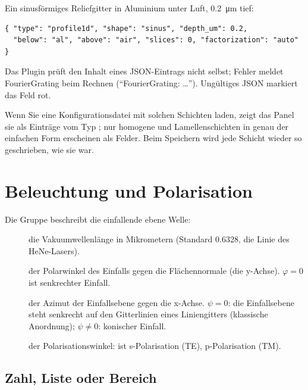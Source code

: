 Ein sinusförmiges Reliefgitter in Aluminium unter Luft, \qty{0.2}{\micro\metre} tief:

\begin{lstlisting}
{ "type": "profile1d", "shape": "sinus", "depth_um": 0.2,
  "below": "al", "above": "air", "slices": 0, "factorization": "auto" }
\end{lstlisting}

Das Plugin prüft den Inhalt eines JSON-Eintrags nicht selbst; Fehler meldet FourierGrating beim
Rechnen (\enquote{FourierGrating: …}). Ungültiges JSON markiert das Feld rot.

\begin{tipp}
Wenn Sie eine Konfigurationsdatei mit solchen Schichten laden, zeigt das Panel sie als Einträge vom
Typ ; nur homogene und Lamellenschichten in genau der einfachen Form erscheinen als
Felder. Beim Speichern wird jede Schicht wieder so geschrieben, wie sie war.
\end{tipp}

\section{Beleuchtung und Polarisation}\label{sec:fg-beleuchtung}

Die Gruppe  beschreibt die einfallende ebene Welle:

\begin{description}
  \item[\gui{$\lambda$ / \si{\micro\metre}}] die Vakuumwellenlänge in Mikrometern
    (Standard 0.6328, die Linie des HeNe-Lasers).
  \item[] der Polarwinkel des Einfalls gegen die Flächennormale (die
    y-Achse). $\varphi = 0$ ist senkrechter Einfall.
  \item[] der Azimut der Einfallsebene gegen die x-Achse. $\psi = 0$: die
    Einfallsebene steht senkrecht auf den Gitterlinien eines Liniengitters (klassische
    Anordnung); $\psi \neq 0$: konischer Einfall.
  \item[] der Polarisationswinkel:  ist s-Polarisation (TE),
     p-Polarisation (TM).
\end{description}

\subsection{Zahl, Liste oder Bereich}\label{sec:fg-scan-syntax}

